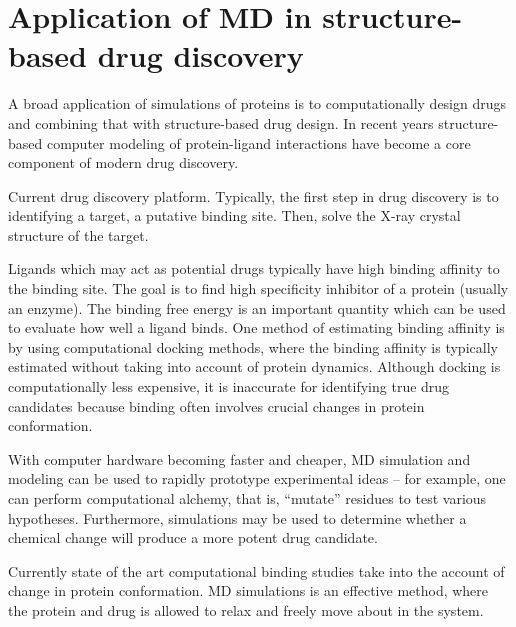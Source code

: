 \section{Application of MD in structure-based drug discovery}

\begin{outline}

	\1 A broad application of simulations of proteins is to computationally design drugs and combining that with structure-based drug design. In recent years structure-based computer modeling of protein-ligand interactions have become a core component of modern drug discovery. 

	\1 Current drug discovery platform. Typically, the first step in drug discovery is to identifying a target, a putative binding site.  Then, solve the X-ray crystal structure of the target.
	
	\1 Ligands which may act as potential drugs typically have high binding affinity to the binding site. The goal is to find high specificity inhibitor of a protein (usually an enzyme). The binding free energy is an important quantity which can be used to evaluate how well a ligand binds. One method of estimating binding affinity is by using computational docking methods, where the binding affinity is typically estimated without taking into account of protein dynamics.  Although docking is computationally less expensive, it is inaccurate for identifying true drug candidates because binding often involves crucial changes in protein conformation.

	\1 With computer hardware becoming faster and cheaper, MD simulation and modeling can be used to rapidly prototype experimental ideas -- for example, one can perform computational alchemy, that is, ``mutate'' residues to test various hypotheses. Furthermore, simulations may be used to determine whether a chemical change will produce a more potent drug candidate.
	
	\1 Currently state of the art computational binding studies take into the account of change in protein conformation. MD simulations is an effective method, where the protein and drug is allowed to relax and freely move about in the system.


\end{outline}
